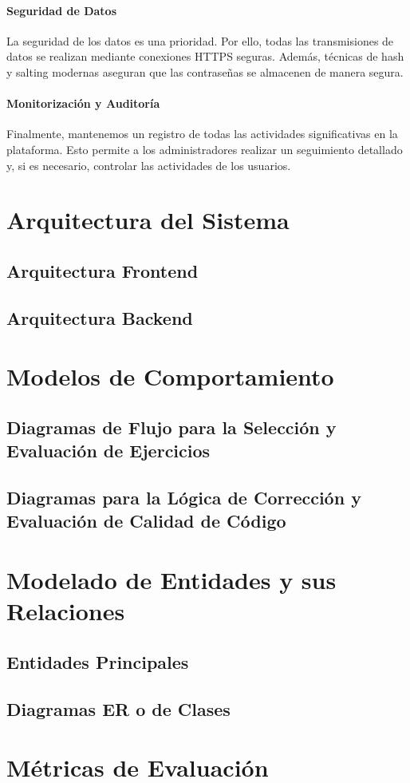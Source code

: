 \paragraph{Seguridad de Datos}
La seguridad de los datos es una prioridad. Por ello, todas las transmisiones de datos se realizan mediante conexiones HTTPS seguras. Además, técnicas de hash y salting modernas aseguran que las contraseñas se almacenen de manera segura.

\paragraph{Monitorización y Auditoría}
Finalmente, mantenemos un registro de todas las actividades significativas en la plataforma. Esto permite a los administradores realizar un seguimiento detallado y, si es necesario, controlar las actividades de los usuarios.

\section{Arquitectura del Sistema}

\subsection{Arquitectura Frontend}

\subsection{Arquitectura Backend}

\section{Modelos de Comportamiento}

\subsection{Diagramas de Flujo para la Selección y Evaluación de Ejercicios}

\subsection{Diagramas para la Lógica de Corrección y Evaluación de Calidad de Código}

\section{Modelado de Entidades y sus Relaciones}

\subsection{Entidades Principales}

\subsection{Diagramas ER o de Clases}

\section{Métricas de Evaluación}
